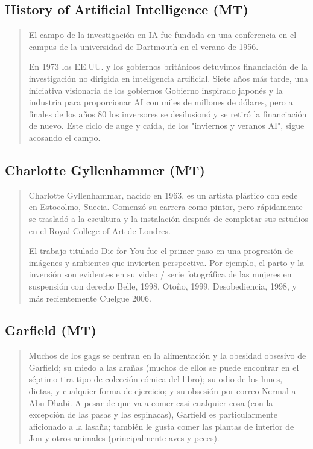 \subsection{History of Artificial Intelligence (MT)}

\begin{quotation}
\noindent El campo de la investigación en IA fue fundada en una conferencia en el campus de la universidad de Dartmouth en el verano de 1956.

En 1973 los EE.UU. y los gobiernos británicos detuvimos financiación de la investigación no dirigida en inteligencia artificial. Siete años más tarde, una iniciativa visionaria de los gobiernos Gobierno inspirado japonés y la industria para proporcionar AI con miles de millones de dólares, pero a finales de los años 80 los inversores se desilusionó y se retiró la financiación de nuevo. Este ciclo de auge y caída, de los "inviernos y veranos AI", sigue acosando el campo.
\end{quotation}

\subsection{Charlotte Gyllenhammer (MT)}

\begin{quotation}
\noindent Charlotte Gyllenhammar, nacido en 1963, es un artista plástico con sede en Estocolmo, Suecia. Comenzó su carrera como pintor, pero rápidamente se trasladó a la escultura y la instalación después de completar sus estudios en el Royal College of Art de Londres.

El trabajo titulado Die for You fue el primer paso en una progresión de imágenes y ambientes que invierten perspectiva. Por ejemplo, el parto y la inversión son evidentes en su video / serie fotográfica de las mujeres en suspensión con derecho Belle, 1998, Otoño, 1999, Desobediencia, 1998, y más recientemente Cuelgue 2006.
\end{quotation}

\subsection{Garfield (MT)}

\begin{quotation}
\noindent Muchos de los gags se centran en la alimentación y la obesidad obsesivo de Garfield; su miedo a las arañas (muchos de ellos se puede encontrar en el séptimo tira tipo de colección cómica del libro); su odio de los lunes, dietas, y cualquier forma de ejercicio; y su obsesión por correo Nermal a Abu Dhabi. A pesar de que va a comer casi cualquier cosa (con la excepción de las pasas y las espinacas), Garfield es particularmente aficionado a la lasaña; también le gusta comer las plantas de interior de Jon y otros animales (principalmente aves y peces).
\end{quotation}

